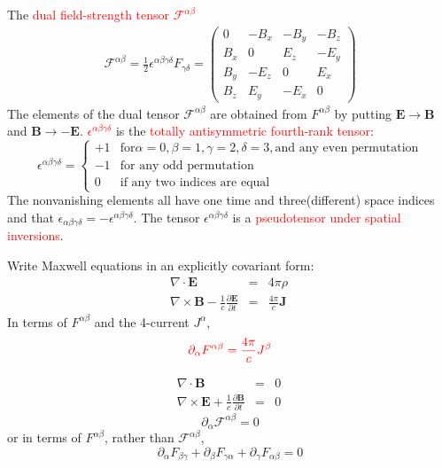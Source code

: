 \documentclass[12pt,a4paper]{article}
\renewcommand{\vec}[1]{\boldsymbol{#1}}
\renewcommand{\arraystretch}{1.5}
\begin{document}
The \textcolor{red}{dual field-strength tensor $\mathscr{F}^{\alpha \beta}$}
\renewcommand{\arraystretch}{1}
\begin{gather*}
\mathscr{F}^{\alpha \beta} = \frac{1}{2} \epsilon^{\alpha\beta\gamma\delta} F_{\gamma \delta} =
\begin{pmatrix} 
0     & -B_x  & -B_y & -B_z \\
B_x &      0  &  E_z & -E_y \\
B_y & -E_z  &      0 &  E_x \\
B_z &  E_y  & -E_x &      0
\end{pmatrix}
\end{gather*}
\renewcommand{\arraystretch}{1.5}
The elements of the dual tensor $\mathscr{F}^{\alpha \beta}$ are obtained from $F^{\alpha \beta}$ by putting $\vec{E} \rightarrow \vec{B}$ and $\vec{B} \rightarrow -\vec{E}$.
\textcolor{red}{$\epsilon^{\alpha\beta\gamma\delta}$} is the \textcolor{red}{totally antisymmetric fourth-rank tensor}:
\begin{equation}
\epsilon^{\alpha\beta\gamma\delta} =
\begin{cases}
+1 & \text{for} \alpha = 0, \beta = 1, \gamma = 2, \delta = 3, \text{and any even permutation} \\
-1  & \text{for any odd permutation} \\
0   & \text{if any two indices are equal}
\end{cases}
\end{equation}
The nonvanishing elements all have one time and three(different) space indices and that $\epsilon_{\alpha\beta\gamma\delta} = -\epsilon^{\alpha\beta\gamma\delta}$. The tensor $\epsilon^{\alpha\beta\gamma\delta}$ is a \textcolor{red}{pseudotensor under spatial inversions}.
 
Write Maxwell equations in an explicitly covariant form:
\begin{eqnarray*}
\nabla \cdot \vec{E} &=& 4\pi \rho ~\\
\nabla \times \vec{B} -\frac{1}{c} \frac{\partial \vec{E}}{\partial t} &=& \frac{4\pi}{c} \vec{J}
\end{eqnarray*}
In terms of $F^{\alpha \beta}$ and the 4-current $J^{\alpha}$,
\begin{equation}
\color{red} \partial_{\alpha} F^{\alpha \beta} = \frac{4\pi}{c} J^{\beta}
\end{equation}

\begin{eqnarray*}
\nabla \cdot \vec{B} &=& 0 ~ \\
\nabla \times \vec{E} + \frac{1}{c} \frac{\partial \vec{B}}{\partial t} &=& 0
\end{eqnarray*}
{\color{red} 
\begin{equation}
\partial_{\alpha} \mathscr{F}^{\alpha \beta} = 0
\end{equation} }
or in terms of $F^{\alpha \beta}$, rather than $\mathscr{F}^{\alpha \beta}$,
{\color{red}
\begin{equation}
\partial_{\alpha} F_{\beta \gamma} +\partial_{\beta} F_{\gamma \alpha} +\partial_{\gamma} F_{\alpha \beta} = 0
\end{equation} }
\end{document}
